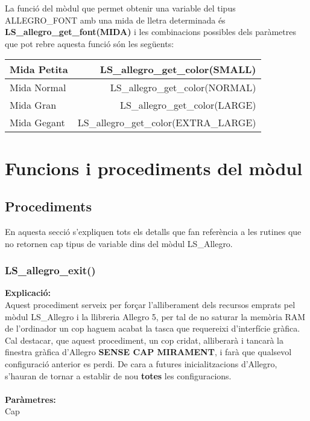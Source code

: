 \documentclass[11pt]{article}
\begin{document}
\pagebreak
\noindent La funció del mòdul que permet obtenir una variable del tipus ALLEGRO\_FONT amb una mida de lletra determinada és \textbf{LS\_allegro\_get\_font(MIDA)} i les combinacions possibles dels paràmetres que pot rebre aquesta funció són les següents:

\begin{center}
\begin{tabular}{|l|r|}
\hline
Mida Petita & LS\_allegro\_get\_color(SMALL) \\
\hline
Mida Normal & LS\_allegro\_get\_color(NORMAL) \\
\hline
Mida Gran & LS\_allegro\_get\_color(LARGE) \\
\hline
Mida Gegant & LS\_allegro\_get\_color(EXTRA\_LARGE) \\
\hline
\end{tabular}
\end{center}

\section{Funcions i procediments del mòdul}

\subsection{Procediments}
En aquesta secció s'expliquen tots els detalls que fan referència a les rutines que no retornen cap tipus de variable dins del mòdul LS\_Allegro.

\subsubsection{LS\_allegro\_exit()}

\textbf{Explicació:}\\
Aquest procediment serveix per forçar l'alliberament dels recursos emprats pel mòdul LS\_Allegro i la llibreria Allegro 5, per tal de no saturar la memòria RAM de l'ordinador un cop haguem acabat la tasca que requereixi d'interfície gràfica. Cal destacar, que aquest procediment, un cop cridat, alliberarà i tancarà la finestra gràfica d'Allegro \textbf{SENSE CAP MIRAMENT}, i farà que qualsevol configuració anterior es perdi. De cara a futures inicialitzacions d'Allegro, s'hauran de tornar a establir de nou \textbf{totes} les configuracions.\\\\
\noindent \textbf{Paràmetres:}\\ Cap
\end{document}
